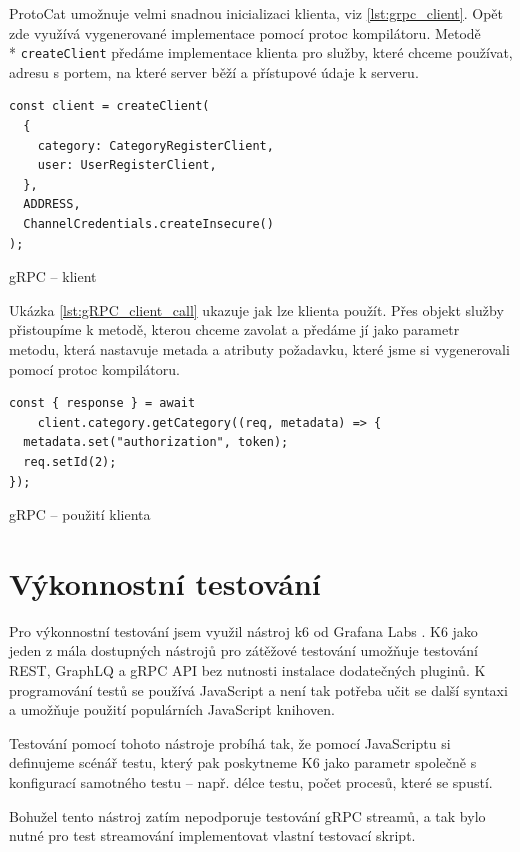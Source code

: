 \documentclass[thesis=M,czech]{FITthesis}[2019/12/23]
\begin{document}
ProtoCat umožnuje velmi snadnou inicializaci klienta, viz \ref{lst:grpc_client}. Opět zde využívá vygenerované implementace pomocí protoc kompilátoru. Metodě \\* \texttt{createClient} předáme implementace klienta pro služby, které chceme používat, adresu s portem, na které server běží a přístupové údaje k serveru.

\begin{listing}[H]
\begin{verbatim}
const client = createClient(
  {
    category: CategoryRegisterClient,
    user: UserRegisterClient,
  },
  ADDRESS,
  ChannelCredentials.createInsecure()
);
\end{verbatim}
\caption{gRPC -- klient}
\label{lst:grpc_client}
\end{listing}

\clearpage
Ukázka \ref{lst:gRPC_client_call} ukazuje jak lze klienta použít. Přes objekt služby přistoupíme k metodě, kterou chceme zavolat a předáme jí jako parametr metodu, která nastavuje metada a atributy požadavku, které jsme si vygenerovali pomocí protoc kompilátoru.

\begin{listing}[H]
\begin{verbatim}
const { response } = await 
    client.category.getCategory((req, metadata) => {
  metadata.set("authorization", token);
  req.setId(2);
});
\end{verbatim}
\caption{gRPC -- použití klienta}
\label{lst:gRPC_client_call}
\end{listing}

\chapter{Výkonnostní testování}
Pro výkonnostní testování jsem využil nástroj k6 od Grafana Labs \cite{k6}. K6 jako jeden z mála dostupných nástrojů pro zátěžové testování umožňuje testování REST, GraphLQ a gRPC API bez nutnosti instalace dodatečných pluginů. K programování testů se používá JavaScript a není tak potřeba učit se další syntaxi a umožňuje použití populárních JavaScript knihoven.

Testování pomocí tohoto nástroje probíhá tak, že pomocí JavaScriptu si definujeme scénář testu, který pak poskytneme K6 jako parametr společně s konfigurací samotného testu -- např. délce testu, počet procesů, které se spustí.

Bohužel tento nástroj zatím nepodporuje testování gRPC streamů, a tak bylo nutné pro test streamování implementovat vlastní testovací skript.
\end{document}
